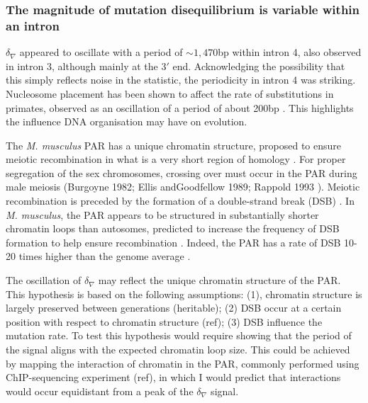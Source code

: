 
\subsubsection{The magnitude of mutation disequilibrium is variable within an intron}

$\delta_\nabla$ appeared to oscillate with a period of $\sim1,470$bp within intron 4, also observed in intron 3, although mainly at the $3'$ end. Acknowledging the possibility that this simply reflects noise in the statistic, the periodicity in intron 4 was striking. Nucleosome placement has been shown to affect the rate of substitutions in primates, observed as an oscillation of a period of about 200bp \citep{Ying2010EvidenceRepair}. This highlights the influence DNA organisation may have on evolution. 

The \textit{M. musculus} PAR has a unique chromatin structure, proposed to ensure meiotic recombination in what is a very short region of homology \citep{Kauppi2011DistinctMeiosis}. For proper segregation of the sex chromosomes, crossing over must occur in the PAR during male meiosis (Burgoyne  1982;  Ellis  andGoodfellow 1989; Rappold 1993 \citep{Perry2001AMice}). Meiotic recombination is preceded by the formation of a double-strand break (DSB) \citep{Keeney2001MechanismInitiation}. In \textit{M. musculus}, the PAR appears to be structured in substantially shorter chromatin loops than autosomes, predicted to increase the frequency of DSB formation to help ensure recombination \citep{Kauppi2011DistinctMeiosis, Acquaviva2020EnsuringRegion}. Indeed, the PAR has a rate of DSB 10-20 times higher than the genome average \citep{Kauppi2011DistinctMeiosis}. 

The oscillation of $\delta_\nabla$ may reflect the unique chromatin structure of the PAR.
This hypothesis is based on the following assumptions: (1), chromatin structure is largely preserved between generations (heritable); (2) DSB occur at a certain position with respect to chromatin structure (ref); (3) DSB influence the mutation rate. To test this hypothesis would require showing that the period of the signal aligns with the expected chromatin loop size. This could be achieved by mapping the interaction of chromatin in the PAR, commonly performed using ChIP-sequencing experiment (ref), in which I would predict that interactions would occur equidistant from a peak of the $\delta_\nabla$ signal.

